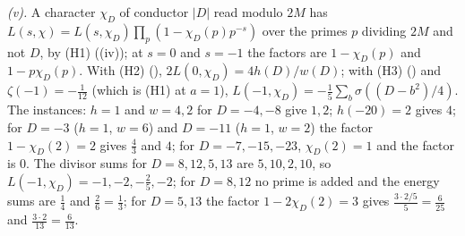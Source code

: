 \emph{(v).} A character $\chi_{D}$ of conductor $|D|$ read modulo $2M$ has $L(s, \chi) = L(s, \chi_{D})\prod_{p}(1 - \chi_{D}(p)p^{-s})$ over the primes $p$ dividing $2M$ and not $D$, by (H1) ((iv)); at $s = 0$ and $s = -1$ the factors are $1 - \chi_{D}(p)$ and $1 - p\chi_{D}(p)$. With (H2) (), $2L(0, \chi_{D}) = 4h(D)/w(D)$; with (H3) () and $\zeta(-1) = -\tfrac1{12}$ (which is (H1) at $a = 1$), $L(-1, \chi_{D}) = -\tfrac15\sum_{b}\sigma((D - b^{2})/4)$. The instances: $h = 1$ and $w = 4, 2$ for $D = -4, -8$ give $1, 2$; $h(-20) = 2$ gives $4$; for $D = -3$ ($h = 1$, $w = 6$) and $D = -11$ ($h = 1$, $w = 2$) the factor $1 - \chi_{D}(2) = 2$ gives $\tfrac43$ and $4$; for $D = -7, -15, -23$, $\chi_{D}(2) = 1$ and the factor is $0$. The divisor sums for $D = 8, 12, 5, 13$ are $5, 10, 2, 10$, so $L(-1, \chi_{D}) = -1, -2, -\tfrac25, -2$; for $D = 8, 12$ no prime is added and the energy sums are $\tfrac14$ and $\tfrac26 = \tfrac13$; for $D = 5, 13$ the factor $1 - 2\chi_{D}(2) = 3$ gives $\tfrac{3 \cdot 2/5}{5} = \tfrac{6}{25}$ and $\tfrac{3 \cdot 2}{13} = \tfrac{6}{13}$.

